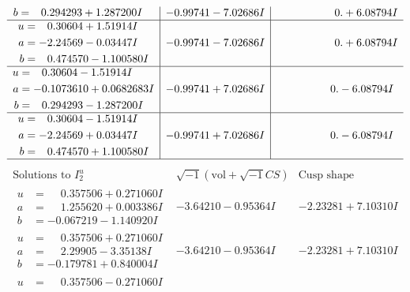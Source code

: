 \documentclass[1p]{elsarticle_modified}
\theoremstyle{definition}
\newcommand{\I}{\sqrt{-1}}
\begin{document}
$$\begin{array}{c|c|c}
\begin{aligned}
b &= \phantom{-}0.294293 + 1.287200 I\end{aligned}
 & -0.99741 - 7.02686 I & \phantom{-0.000000 -}0. + 6.08794 I \\ \hline\begin{aligned}
u &= \phantom{-}0.30604 + 1.51914 I \\
a &= -2.24569 - 0.03447 I \\
b &= \phantom{-}0.474570 - 1.100580 I\end{aligned}
 & -0.99741 - 7.02686 I & \phantom{-0.000000 -}0. + 6.08794 I \\ \hline\begin{aligned}
u &= \phantom{-}0.30604 - 1.51914 I \\
a &= -0.1073610 + 0.0682683 I \\
b &= \phantom{-}0.294293 - 1.287200 I\end{aligned}
 & -0.99741 + 7.02686 I & \phantom{-0.000000 } 0. - 6.08794 I \\ \hline\begin{aligned}
u &= \phantom{-}0.30604 - 1.51914 I \\
a &= -2.24569 + 0.03447 I \\
b &= \phantom{-}0.474570 + 1.100580 I\end{aligned}
 & -0.99741 + 7.02686 I & \phantom{-0.000000 } 0. - 6.08794 I\\
 \hline 
 \end{array}$$\newpage$$\begin{array}{c|c|c}  
\text{Solutions to }I^u_{2}& \I (\text{vol} + \sqrt{-1}CS) & \text{Cusp shape}\\
 \hline 
\begin{aligned}
u &= \phantom{-}0.357506 + 0.271060 I \\
a &= \phantom{-}1.255620 + 0.003386 I \\
b &= -0.067219 - 1.140920 I\end{aligned}
 & -3.64210 - 0.95364 I & -2.23281 + 7.10310 I \\ \hline\begin{aligned}
u &= \phantom{-}0.357506 + 0.271060 I \\
a &= \phantom{-}2.29905 - 3.35138 I \\
b &= -0.179781 + 0.840004 I\end{aligned}
 & -3.64210 - 0.95364 I & -2.23281 + 7.10310 I \\ \hline\begin{aligned}
u &= \phantom{-}0.357506 - 0.271060 I \\

\end{aligned}
\end{array}$$
\end{document}
